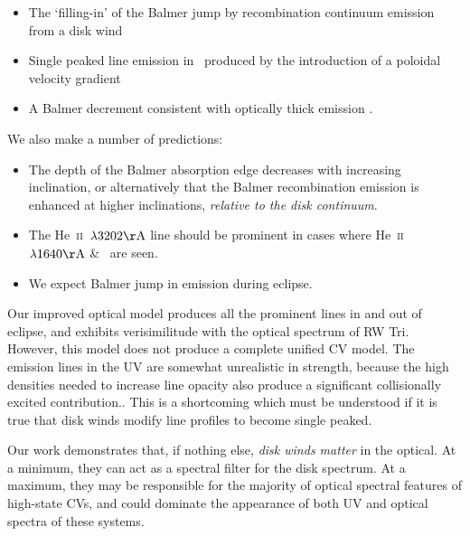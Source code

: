 \documentclass[preprint, a4paper, 11pt]{aastex}
\begin{document}
\renewcommand{\labelitemi}{$\bullet$}
\begin{itemize}
	\item The `filling-in' of the Balmer jump \citep{KLWB98} by recombination 
	continuum emission from a disk wind
	\item Single peaked line emission in \ha\ produced by 
	the introduction of a poloidal velocity gradient \citep{MC96}
	\item A Balmer decrement consistent with optically thick emission \citep{elitzur1983}.
\end{itemize}
\smallskip

\noindent We also make a number of predictions:

\begin{itemize}
	\item The depth of the Balmer absorption edge decreases with increasing inclination,
or alternatively that the Balmer recombination emission
is enhanced at higher inclinations, {\sl relative to the disk continuum}.
	\item The He~\textsc{ii}~$\lambda3202{\rm \AA}$ line should be
prominent in cases where He~\textsc{ii}~$\lambda1640{\rm \AA}$ \& 
\heiiopt\ are seen. 
	\item We expect Balmer jump in emission during eclipse.
\end{itemize}

\smallskip
Our improved optical model produces all the prominent lines in and out of eclipse, and
exhibits verisimilitude with the optical spectrum of RW Tri.
However, this model does not produce a complete unified CV model. 
The emission lines in the UV are somewhat unrealistic in strength,
because the high densities needed to increase line opacity also produce
a significant collisionally excited contribution..
This is a shortcoming which must be understood if it is true that
disk winds modify line profiles to become single peaked.

Our work demonstrates that, if nothing else,
{\sl disk winds matter} in the optical. At a minimum,
they can act as a spectral filter
for the disk spectrum.
At a maximum, they may be responsible
for the majority of optical spectral features of high-state CVs,
and could dominate the appearance of both UV and optical
spectra of these systems.

\end{document}
